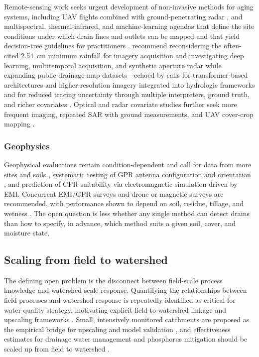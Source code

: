 Remote-sensing work seeks urgent development of non-invasive methods for aging
systems, including UAV flights combined with ground-penetrating radar
\parencite{Wienken2024}, and multispectral, thermal-infrared, and
machine-learning agendas that define the site conditions under which drain
lines and outlets can be mapped and that yield decision-tree guidelines for
practitioners \parencite{Allred2020,Allred2021,Allred2022}. \textcite{Carlsen2024}
recommend reconsidering the often-cited 2.54~cm minimum rainfall for imagery
acquisition and investigating deep learning, multitemporal acquisition, and
synthetic aperture radar while expanding public drainage-map datasets---echoed
by calls for transformer-based architectures and higher-resolution imagery
integrated into hydrologic frameworks \parencite{Wan2024} and for reduced
tracing uncertainty through multiple interpreters, ground truth, and richer
covariates \parencite{Redoloza2023,Harris2018,Yimer2023}. Optical and radar
covariate studies further seek more frequent imaging, repeated SAR with ground
measurements, and UAV cover-crop mapping
\parencite{Tlapáková2017,Meunier2001,Xu2018}.

\subsubsection{Geophysics}

Geophysical evaluations remain condition-dependent and call for data from more
sites and soils \parencite{Allred2005}, systematic testing of GPR antenna
configuration and orientation \parencite{Allred2013}, and prediction of GPR
suitability via electromagnetic simulation driven by EMI. Concurrent EMI/GPR
surveys and drone or magnetic surveys are recommended, with performance shown to
depend on soil, residue, tillage, and wetness
\parencite{Koganti2020,Koganti2021,Jouen2018,Kratt2020,Allred2018b}. The
open question is less whether any single method can detect drains than how to
specify, in advance, which method suits a given soil, cover, and moisture
state.

\subsection{Scaling from field to watershed}

The defining open problem is the disconnect between field-scale process
knowledge and watershed-scale response. Quantifying the relationships between
field processes and watershed response is repeatedly identified as critical for
water-quality strategy, motivating explicit field-to-watershed linkage and
upscaling frameworks \parencite{Williams2015,Williams2017,Wang2020b}. Small,
intensively monitored catchments are proposed as the empirical bridge for
upscaling and model validation \parencite{Kyllmar2023,Basu2010}, and
effectiveness estimates for drainage water management and phosphorus mitigation
should be scaled up from field to watershed
\parencite{Wang2021,Ross2016,Shedekar2021}.

